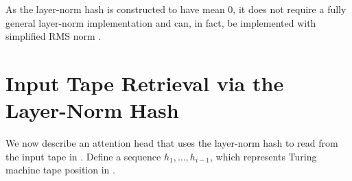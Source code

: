 As the layer-norm hash is constructed to have mean 0, it does not require a fully general layer-norm implementation and can, in fact, be implemented with simplified RMS norm \citep{zhang2019rms}.







\section{Input Tape Retrieval via the Layer-Norm Hash} \label{sec:input-tape}

We now describe an attention head that uses the layer-norm hash to read from the input tape in .
Define a sequence $h_1, \ldots, h_{i-1}$, which represents Turing machine tape position in .

